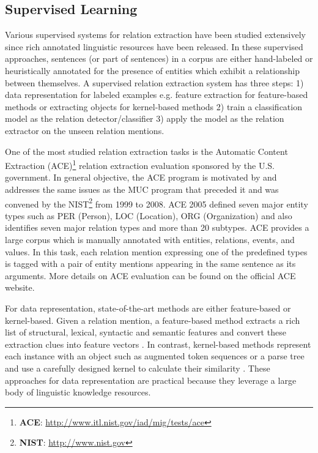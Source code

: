 \subsection{Supervised Learning}
\label{subsection:supervised-learning}
Various supervised systems for relation extraction have been studied extensively since rich annotated linguistic resources have been released. In these supervised approaches, sentences (or part of sentences) in a corpus are either hand-labeled or heuristically annotated for the presence of entities which exhibit a relationship between themselves. A supervised relation extraction system has three steps: 1) data representation for labeled examples e.g. feature extraction for feature-based methods or extracting objects for kernel-based methods 2) train a classification model as the relation detector/classifier 3) apply the model as the relation extractor on the unseen relation mentions. 

One of the most studied relation extraction tasks is the Automatic Content Extraction (ACE)\footnote{\textbf{ACE}: \url{http://www.itl.nist.gov/iad/mig/tests/ace}} relation extraction evaluation sponsored by the U.S. government. In general objective, the ACE program is motivated by and addresses the same issues as the MUC program that preceded it and was convened by the NIST\footnote{\textbf{NIST}: \url{http://www.nist.gov}} from 1999 to 2008. ACE 2005 defined seven major entity types such as PER (Person), LOC (Location), ORG (Organization) and also identifies seven major relation types and more than 20 subtypes. ACE provides a large corpus which is manually annotated with entities, relations, events, and values. In this task, each relation mention expressing one of the predefined types is tagged with a pair of entity mentions appearing in the same sentence as its arguments. More details on ACE evaluation can be found on the official ACE website. 

For data representation, state-of-the-art methods are either feature-based or kernel-based. Given a relation mention, a feature-based method extracts a rich list of structural, lexical, syntactic and semantic features and convert these extraction clues into feature vectors \cite{guodong2005exploring} \cite{nguyen2014employing}. In contrast, kernel-based methods represent each instance with an object such as augmented token sequences or a parse tree and use a carefully designed kernel to calculate their similarity \cite{qian2008exploiting} \cite{culotta2004dependency}. These approaches for data representation are practical because they leverage a large body of linguistic knowledge resources. 

